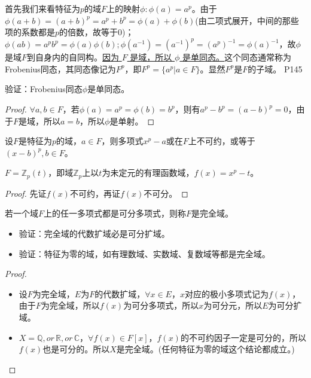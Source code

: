 \original
{
	首先我们来看特征为$p$的域$F$上的映射$\phi:\phi(a)=a^{p}$。由于$\phi(a+b)=(a+b)^{p}=a^{p}+b^{p}=\phi(a)+\phi(b)$(由二项式展开，中间的那些项的系数都是$p$的倍数，故等于0)；$\phi(ab)=a^{p}b^{p}=\phi(a)\phi(b);\phi(a^{-1})=(a^{-1})^{p}=(a^{p})^{-1}=\phi(a)^{-1}$，故$\phi$是域$F$到自身内的自同构。\uline{因为 $F$ 是域，所以 $\phi$ 是单同态。}这个同态通常称为Frobenius同态，其同态像记为$F^{p}$，即$F^{p}=\{a^{p}\big| a\in F\}$。显然$F^{p}$是$F$的子域。
}
{P145}

\begin{proposition}
	验证：Frobenius同态$\phi$是单同态。
\end{proposition}
\begin{proof}
	$\forall a,b\in F$，若$\phi(a)=a^{p}=\phi(b)=b^{p}$，则有$a^{p}-b^{p}=(a-b)^{p}=0$，由于$F$是域，所以$a=b$，所以$\phi$是单射。
\end{proof}

\begin{lemma}
	设$F$是特征为$p$的域，$a\in F$，则多项式$x^{p}-a$或在$F$上不可约，或等于$(x-b)^{p},b\in F$。
\end{lemma}

\begin{example}
	$F=\mathbb{Z}_{p}(t)$，即域$\mathbb{Z}_{p}$上以$t$为未定元的有理函数域，$f(x)=x^{p}-t$。
\end{example}

\begin{proof}
	先证$f(x)$不可约，再证$f(x)$不可分。
\end{proof}

\begin{definition}
	若一个域$F$上的任一多项式都是可分多项式，则称$F$是完全域。
\end{definition}

\begin{proposition}
	\begin{itemize}
		\item 验证：完全域的代数扩域必是可分扩域。
		\item 验证：特征为零的域，如有理数域、实数域、复数域等都是完全域。
	\end{itemize}
\end{proposition}

\begin{proof}
	\begin{itemize}
		\item 设$F$为完全域，$E$为$F$的代数扩域，$\forall x\in E$，$x$对应的极小多项式记为$f(x)$，由于$F$为完全域，所以$f(x)$为可分多项式，所以$x$为可分元，所以$E$为可分扩域。
		
		\item $X=\mathbb{Q},or\, \mathbb{R},or\, \mathbb{C}$，$\forall f(x)\in F[x]$，$f(x)$的不可约因子一定是可分的，所以$f(x)$也是可分的。所以$X$是完全域。(任何特征为零的域这个结论都成立。)
	\end{itemize}
\end{proof}


